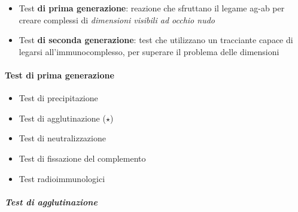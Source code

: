 \documentclass[italian,]{article}
\providecommand{\tightlist}{%
  \setlength{\itemsep}{0pt}\setlength{\parskip}{0pt}}
\begin{document}
\begin{itemize}
\tightlist
\item
  Test \textbf{di prima generazione}: reazione che sfruttano il legame
  ag-ab per creare complessi di \emph{dimensioni visibili ad occhio
  nudo}
\item
  Test \textbf{di seconda generazione}: test che utilizzano un
  tracciante capace di legarsi all'immunocomplesso, per superare il
  problema delle dimensioni
\end{itemize}

\hypertarget{test-di-prima-generazione}{%
\paragraph{Test di prima generazione}\label{test-di-prima-generazione}}

\begin{itemize}
\tightlist
\item
  Test di precipitazione
\item
  Test di agglutinazione (\(\star\))
\item
  Test di neutralizzazione
\item
  Test di fissazione del complemento
\item
  Test radioimmunologici
\end{itemize}

\hypertarget{test-di-agglutinazione}{%
\subparagraph{Test di agglutinazione}\label{test-di-agglutinazione}}
\end{document}
